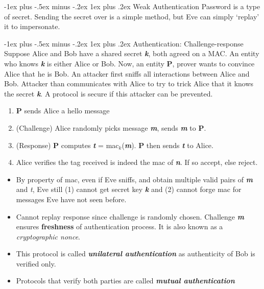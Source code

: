 \documentclass[10pt,landscape]{article}
\makeatletter
\renewcommand{\subsubsection}{\@startsection{subsubsection}{3}{0mm}%
                                {-1ex plus -.5ex minus -.2ex}%
                                {1ex plus .2ex}%
                                {\normalfont\small\bfseries}}
\makeatother
\begin{document}
\begin{multicols*}{3}
\subsubsection{Weak Authentication}
Password is a type of secret. Sending the secret over is a simple method, but Eve can simply `replay' it to impersonate.

\subsubsection{Authentication: Challenge-response}
Suppose Alice and Bob have a shared secret \textit{\textbf{k}}, both agreed on a MAC. An entity who knows \textit{\textbf{k}}
is either Alice or Bob. Now, an entity \textbf{P}, prover wants to convince Alice that he is Bob.
An attacker first sniffs all interactions between Alice and Bob. Attacker than communicates with Alice to try to trick Alice that it knows the 
secret \textit{\textbf{k}}. A protocol is secure if this attacker can be prevented.
\begin{enumerate}[noitemsep,wide=0pt, leftmargin=\dimexpr\labelwidth + 2\labelsep\relax]
    \item \textbf{P} sends Alice a hello message
    \item (Challenge) Alice randomly picks message \textit{\textbf{m}}, sends \textit{\textbf{m}} to \textbf{P}.
    \item (Response) \textbf{P} computes \textit{\textbf{t}} = mac$_k$(\textit{\textbf{m}}). \textbf{P} then sends \textit{\textbf{t}} to Alice.
    \item Alice verifies the tag received is indeed the mac of \textit{\textbf{n}}. If so accept, else reject.
\end{enumerate}

\begin{itemize}[noitemsep,wide=0pt, leftmargin=\dimexpr{} + 2\relax]
    \item By property of mac, even if Eve sniffs, and obtain multiple valid pairs of \textbf{\textit{m}} and \textit{t},
    Eve still (1) cannot get secret key \textit{\textbf{k}} and (2) cannot forge mac for messages Eve have not seen before.
    \item Cannot replay response since challenge is randomly chosen. Challenge \textbf{\textit{m}} ensures \textbf{freshness} of authentication process. It is also known as a \textit{cryptographic nonce}. 
    \item This protocol is called \textit{\textbf{unilateral authentication}} as authenticity of Bob is verified only. 
    \item Protocols that verify both parties are called \textit{\textbf{mutual authentication}}
\end{itemize}


\end{multicols*}
\end{document}
